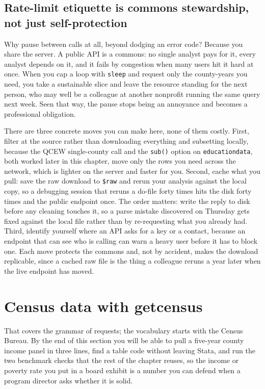 \subsection{Rate-limit etiquette is commons stewardship, not just self-protection}\label{ch03-commons}
Why pause between calls at all, beyond dodging an error code? Because you share the server. A public API is a commons: no single analyst pays for it, every analyst depends on it, and it fails by congestion when many users hit it hard at once. When you cap a loop with \texttt{sleep} and request only the county-years you need, you take a sustainable slice and leave the resource standing for the next person, who may well be a colleague at another nonprofit running the same query next week. Seen that way, the pause stops being an annoyance and becomes a professional obligation.

There are three concrete moves you can make here, none of them costly. First, filter at the source rather than downloading everything and subsetting locally, because the QCEW single-county call and the \texttt{sub()} option on \texttt{educationdata}, both worked later in this chapter, move only the rows you need across the network, which is lighter on the server and faster for you. Second, cache what you pull: save the raw download to \texttt{\$raw} and rerun your analysis against the local copy, so a debugging session that reruns a do-file forty times hits the disk forty times and the public endpoint once. The order matters: write the reply to disk before any cleaning touches it, so a parse mistake discovered on Thursday gets fixed against the local file rather than by re-requesting what you already had. Third, identify yourself where an API asks for a key or a contact, because an endpoint that can see who is calling can warn a heavy user before it has to block one. Each move protects the commons and, not by accident, makes the download replicable, since a cached raw file is the thing a colleague reruns a year later when the live endpoint has moved.

\section{Census data with getcensus}
That covers the grammar of requests; the vocabulary starts with the Census Bureau. By the end of this section you will be able to pull a five-year county income panel in three lines, find a table code without leaving Stata, and run the two benchmark checks that the rest of the chapter reuses, so the income or poverty rate you put in a board exhibit is a number you can defend when a program director asks whether it is solid.

